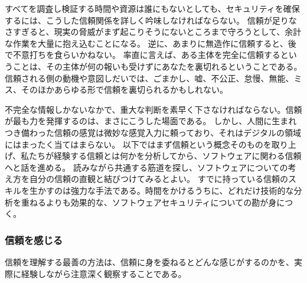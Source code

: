 \documentclass[uplatex]{jsarticle}
\begin{document}
すべてを調査し検証する時間や資源は誰にもないとしても、セキュリティを確保するには、こうした信頼関係を詳しく吟味しなければならない。
信頼が足りなさすぎると、現実の脅威がまず起こりそうにないところまで守ろうとして、余計な作業を大量に抱え込むことになる。
逆に、あまりに無造作に信頼すると、後で不意打ちを食らいかねない。
率直に言えば、ある主体を完全に信頼するということは、その主体が何の報いも受けずにあなたを裏切れるということである。
信頼される側の動機や意図しだいでは、ごまかし、嘘、不公正、怠慢、無能、ミス、そのほかあらゆる形で信頼を裏切られるかもしれない。

不完全な情報しかないなかで、重大な判断を素早く下さなければならない。信頼が最も力を発揮するのは、まさにこうした場面である。
しかし、人間に生まれつき備わった信頼の感覚は微妙な感覚入力に頼っており、それはデジタルの領域にはまったく当てはまらない。
以下ではまず信頼という概念そのものを取り上げ、私たちが経験する信頼とは何かを分析してから、ソフトウェアに関わる信頼へと話を進める。
読みながら共通する筋道を探し、ソフトウェアについての考え方を自分の信頼の直観と結びつけてみるとよい。
すでに持っている信頼のスキルを生かすのは強力な手法である。時間をかけるうちに、どれだけ技術的な分析を重ねるよりも効果的な、ソフトウェアセキュリティについての勘が身につく。

\subsubsection{信頼を感じる}

信頼を理解する最善の方法は、信頼に身を委ねるとどんな感じがするのかを、実際に経験しながら注意深く観察することである。
\end{document}

